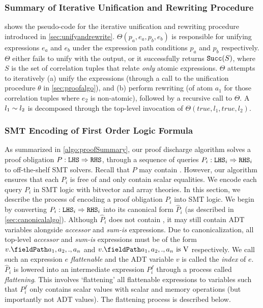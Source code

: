 

\subsubsection{Summary of Iterative Unification and Rewriting Procedure}
\label{sec:unifyandrewritealgo}
 shows the pseudo-code for the iterative unification and rewriting procedure
introduced in \cref{sec:unifyandrewrite}.
$\Theta(p_a,e_a,p_b,e_b)$ is responsible for unifying expressions $e_a$ and $e_b$ under the expression
path conditions $p_a$ and $p_b$ respectively.
$\Theta$ either fails to unify with the  output, or it successfully returns ${\tt Succ}(S)$, where $S$
is the set of correlation tuples that relate {\em only} atomic expressions.
$\Theta$ attempts to iteratively (a) unify the expressions (through a call to the unification procedure $\theta$ in \cref{sec:proofalgo}),
and (b) perform rewriting (of atom $a_1$ for those correlation tuples  where $e_2$ is non-atomic), followed by
a recursive call to $\Theta$.
A \recursiveRelation{} $l_1 \sim{} l_2$ is decomposed through the top-level invocation of $\Theta(true,l_1,true,l_2)$.



\subsubsection{SMT Encoding of First Order Logic Formula}
\label{sec:smtencoding}
As summarized in \cref{algo:proofSummary}, our proof discharge algorithm solves a proof obligation $P: {\tt LHS}{} \Rightarrow {\tt RHS}{}$,
through a sequence of queries $P_i : {\tt LHS}{}_i \Rightarrow {\tt RHS}{}_i$ to off-the-shelf SMT solvers.
Recall that $P$ may contain \recursiveRelations{}.
However, our algorithm ensures that each $P_i$ is free of \recursiveRelations{} and only contain
scalar equalities.
We encode each query $P_i$ in SMT logic with bitvector and array theories.
In this section, we describe the process of encoding a proof obligation $P_i$ into SMT logic.
We begin by converting $P_i : {\tt LHS}{}_i \Rightarrow {\tt RHS}{}_i$ into its canonical form $\hat{P}_i$
(as described in \cref{sec:canonicalalgo}).
Although $\hat{P}_i$ does not contain \recursiveRelations{}, it may still contain
ADT variables alongside {\em accessor} and {\em sum-is} expressions.
Due to canonicalization, all top-level {\em accessor} and {\em sum-is} expressions must be of the form
$\prodAccess{v}{a_1,a_2,.,a_n}$ and $\sumIs{\prodAccess{v}{a_1,a_2,.,a_n}}{\textnormal{V}}$ respectively.
We call such an expression $e$ {\em flattenable} and the ADT variable $v$ is called the {\em index} of $e$.
$\hat{P}_i$ is lowered into an intermediate expression $P_i^f$ through a process called {\em flattening}.
This involves `flattening' all flattenable expressions to variables such that
$P_i^f$ only contains scalar values with scalar and memory operations (but importantly not ADT values).
The flattening process is described below.

